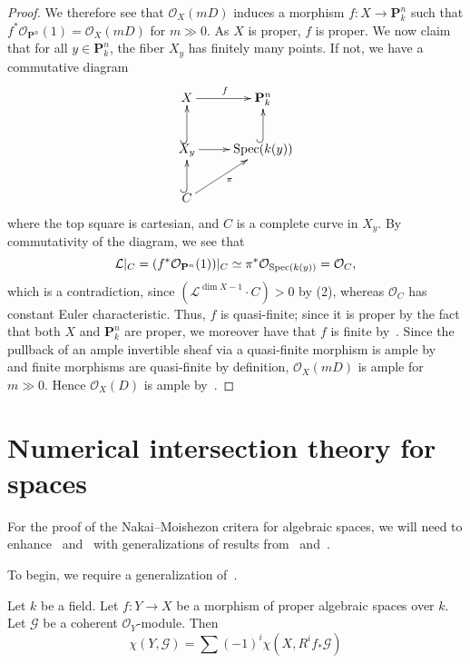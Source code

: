 \begin{proof}
We therefore see that $\mathcal{O}_X(mD)$ induces a morphism $f : X \to
\mathbf{P}^n_k$ such that $f^*\mathcal{O}_{\mathbf{P}^n}(1) =
\mathcal{O}_X(mD)$ for $m \gg 0$. As $X$ is proper, $f$ is proper.
We now claim that for all $y \in \mathbf{P}^n_k$, the fiber $X_y$ has finitely
many points. If not, we have a commutative diagram
$$
\xymatrix{
  X \ar[r]^f & \mathbf{P}^n_k\\
  X_y \ar@{^{(}->}[u] \ar[r] & \Spec(k(y)) \ar@{^{(}->}[u]\\
  C \ar@{^{(}->}[u]\ar[ur]_\pi
}
$$
where the top square is cartesian, and $C$ is a complete curve in $X_y$. By
commutativity of the diagram, we see that
$$
  \mathcal{L}\rvert_C =
    (f^*\mathcal{O}_{\mathbf{P}^n}(1))\rvert_C \simeq
    \pi^*\mathcal{O}_{\mathop{\rm Spec}(k(y))} =
    \mathcal{O}_C,
$$
which is a contradiction, since $(\mathcal{L}^{\dim X - 1} \cdot C) > 0$ by (2),
whereas $\mathcal{O}_C$ has constant Euler characteristic. Thus, $f$ is
quasi-finite; since it is proper by the fact that both $X$ and $\mathbf{P}^n_k$
are proper, we moreover have that $f$ is finite by~.
Since the pullback of an ample invertible sheaf via a quasi-finite morphism is
ample by~ and finite
morphisms are quasi-finite by definition,
$\mathcal{O}_X(mD)$ is ample for $m \gg 0$.
Hence $\mathcal{O}_X(D)$ is ample by~.
\end{proof}

\section{Numerical intersection theory for spaces}
For the proof of the Nakai--Moishezon critera for algebraic spaces, we will
need to enhance~ and~ with generalizations of results
from~ and~.

To begin, we require a generalization of~.

\begin{lemma}
\label{lemma-euler-characteristic-morphism}
Let $k$ be a field.
Let $f : Y \to X$ be a morphism of proper algebraic spaces over $k$.
Let $\mathcal{G}$ be a coherent $\mathcal{O}_Y$-module.
Then
$$
\chi(Y, \mathcal{G}) = \sum (-1)^i \chi(X, R^if_*\mathcal{G})
$$
\end{lemma}


